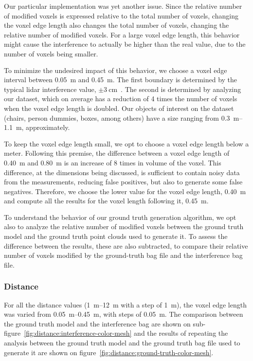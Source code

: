 Our particular implementation was yet another issue. Since the relative number of modified voxels is expressed relative to the total number of voxels, changing the voxel edge length also changes the total number of voxels, changing the relative number of modified voxels. For a large voxel edge length, this behavior might cause the interference to actually be higher than the real value, due to the number of voxels being smaller. 

To minimize the undesired impact of this behavior, we choose a voxel edge interval between \SI{0.05}{\meter} and \SI{0.45}{\meter}. The first boundary is determined by the typical \ac{lidar} interference value, $\pm\SI{3}{\centi\meter}$~\cite{VLP16}. The second is determined by analyzing our dataset, which on average has a reduction of 4 times the number of voxels when the voxel edge length is doubled. Our objects of interest on the dataset (chairs, person dummies, boxes, among others) have a size ranging from \SIrange{0.3}{1.1}{\meter}, approximately. 

To keep the voxel edge length small, we opt to choose a voxel edge length below a meter. Following this premise, the difference between a voxel edge length of \SI{0.40}{\meter} and \SI{0.80}{\meter} is an increase of 8 times in volume of the voxel. This difference, at the dimensions being discussed, is sufficient to contain noisy data from the measurements, reducing false positives, but also to generate some false negatives. Therefore, we choose the lower value for the voxel edge length, \SI{0.40}{\meter} and compute all the results for the voxel length following it, \SI{0.45}{\meter}.

To understand the behavior of our ground truth generation algorithm, we opt also to analyze the relative number of modified voxels between the ground truth model and the ground truth point clouds used to generate it. To assess the difference between the results, these are also subtracted, to compare their relative number of voxels modified by the ground-truth bag file and the interference bag file.

\subsubsection{Distance}
For all the distance values (\SIrange{1}{12}{\meter} with a step of \SI{1}{\meter}), the voxel edge length was varied from \SIrange{0.05}{0.45}{\meter}, with steps of \SI{0.05}{\meter}. The comparison between the ground truth model and the interference bag are shown on sub-figure~\ref{fig:distance:interference-color-mesh} and the results of repeating the analysis between the ground truth model and the ground truth bag file used to generate it are shown on figure~\ref{fig:distance:ground-truth-color-mesh}.

